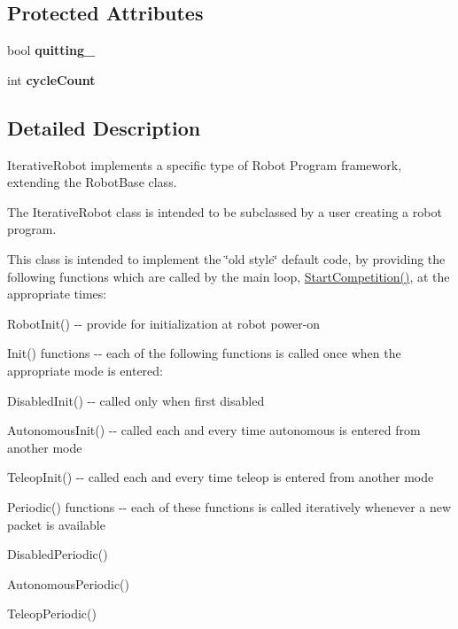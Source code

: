 \subsection*{\-Protected \-Attributes}
\begin{DoxyCompactItemize}
\item 
\hypertarget{class_l_r_t_robot_base_a034106e704c8c9c1dba6b582c8181a40}{
bool {\bfseries quitting\-\_\-}}
\label{class_l_r_t_robot_base_a034106e704c8c9c1dba6b582c8181a40}

\item 
\hypertarget{class_l_r_t_robot_base_aea6cb7f9036013e76242d06912443bcd}{
int {\bfseries cycle\-Count}}
\label{class_l_r_t_robot_base_aea6cb7f9036013e76242d06912443bcd}

\end{DoxyCompactItemize}


\subsection{\-Detailed \-Description}
\-Iterative\-Robot implements a specific type of \-Robot \-Program framework, extending the \-Robot\-Base class.

\-The \-Iterative\-Robot class is intended to be subclassed by a user creating a robot program.

\-This class is intended to implement the \char`\"{}old style\char`\"{} default code, by providing the following functions which are called by the main loop, \hyperlink{class_l_r_t_robot_base_a242e46650b04f58baaa6c3c585a15634}{\-Start\-Competition()}, at the appropriate times\-:

\-Robot\-Init() -\/-\/ provide for initialization at robot power-\/on

\-Init() functions -\/-\/ each of the following functions is called once when the appropriate mode is entered\-:
\begin{DoxyItemize}
\item \-Disabled\-Init() -\/-\/ called only when first disabled
\item \-Autonomous\-Init() -\/-\/ called each and every time autonomous is entered from another mode
\item \-Teleop\-Init() -\/-\/ called each and every time teleop is entered from another mode
\end{DoxyItemize}

\-Periodic() functions -\/-\/ each of these functions is called iteratively whenever a new packet is available
\begin{DoxyItemize}
\item \-Disabled\-Periodic()
\item \-Autonomous\-Periodic()
\item \-Teleop\-Periodic() 
\end{DoxyItemize}

